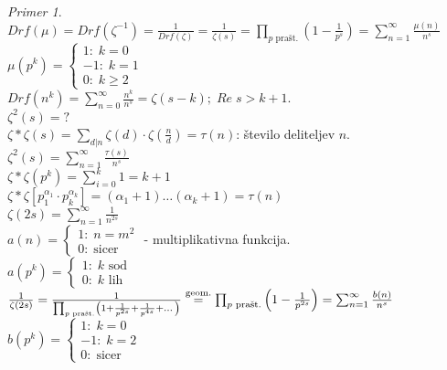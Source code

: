 \documentclass[a4paper, 12pt]{book}
\theoremstyle{definition}
\theoremstyle{remark}
\newtheorem*{ex}{Primer}
\begin{document}
\begin{ex} \text{} \\
  $Drf(\mu) = Drf(\zeta^{-1}) = \frac{1}{Drf(\zeta)} = \frac{1}{\zeta(s)} =
  \prod_{p \text{ prašt.}} \left(1 - \frac{1}{p^s}\right) = \sum_{n=1}^{\infty} \frac{\mu(n)}{n^s}$ \\
  $\mu\left(p^k\right) = \begin{cases}
    1: \; k = 0 \\
    -1: \; k = 1 \\
    0: \; k \geq 2
  \end{cases}$ \\
  $Drf\left(n^k\right) = \sum_{n=0}^{\infty} \frac{n^k}{n^s} = \zeta(s-k); \; Re \; s > k+1$. \\
  $\zeta^2(s) = ?$ \\
  $\zeta * \zeta(s) = \sum_{d | n} \zeta(d) \cdot \zeta\left(\frac{n}{d}\right) = \tau(n)$: število deliteljev $n$. \\
  $\zeta^2(s) = \sum_{n=1}^{\infty} \frac{\tau(s)}{n^s}$ \\
  $\zeta * \zeta(p^k) = \sum_{i=0}^{k} 1 = k+1$ \\
  $\zeta * \zeta\left[p_1^{\alpha_1} \cdot p_k^{\alpha_k}\right] = (\alpha_1 + 1) \dots (\alpha_k + 1) = \tau(n)$ \\
  $\zeta(2s) = \sum_{n=1}^{\infty} \frac{1}{n^{2s}}$ \\
  $a(n) = \begin{cases}
    1: \; n = m^2 \\
    0: \; \text{sicer}
  \end{cases}$ - multiplikativna funkcija. \\
  $a(p^k) = \begin{cases}
    1: \; k \text{ sod} \\
    0: \; k \text{ lih}
  \end{cases}$ \\
  $\frac{1}{\zeta(2s)} = \frac{1}{\prod_{p \text{ prašt.}} \left(1 + \frac{1}{p^{2s}} + \frac{1}{p^{4s}} + \dots\right)} \\
  \stackrel{\text{geom.}}{=} \prod_{p \text{ prašt.}} \left(1 - \frac{1}{p^{2s}}\right)
  = \sum_{n=1}^{\infty} \frac{b(n)}{n^s}$ \\
  $b(p^k) = \begin{cases}
    1: \; k = 0 \\
    -1: \; k = 2 \\
    0: \; \text{sicer}
  \end{cases}$ \\

\end{ex}
\end{document}
